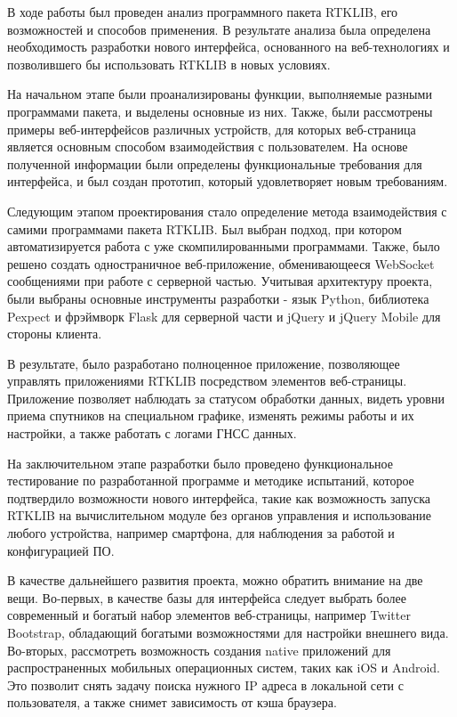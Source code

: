 \conclusion

В ходе работы был проведен анализ программного пакета RTKLIB, его возможностей и способов применения. В результате анализа была определена необходимость разработки нового интерфейса, основанного на веб-технологиях и позволившего бы использовать RTKLIB в новых условиях.

На начальном этапе были проанализированы функции, выполняемые разными программами пакета, и выделены основные из них. Также, были рассмотрены примеры веб-интерфейсов различных устройств, для которых веб-страница является основным способом взаимодействия с пользователем. На основе полученной информации были определены функциональные требования для интерфейса, и был создан прототип, который удовлетворяет новым требованиям.

Следующим этапом проектирования стало определение метода взаимодействия с самими программами пакета RTKLIB. Был выбран подход, при котором автоматизируется работа с уже скомпилированными программами. Также, было решено создать одностраничное веб-приложение, обменивающееся WebSocket сообщениями при работе с серверной частью. Учитывая архитектуру проекта, были выбраны основные инструменты разработки - язык Python, библиотека Pexpect и фрэймворк Flask для серверной части и jQuery и jQuery Mobile для стороны клиента.

В результате, было разработано полноценное приложение, позволяющее управлять приложениями RTKLIB посредством элементов веб-страницы. Приложение позволяет наблюдать за статусом обработки данных, видеть уровни приема спутников на специальном графике, изменять режимы работы и их настройки, а также работать с логами ГНСС данных.

На заключительном этапе разработки было проведено функциональное тестирование по разработанной программе и методике испытаний, которое подтвердило возможности нового интерфейса, такие как возможность запуска RTKLIB на вычислительном модуле без органов управления и использование любого устройства, например смартфона, для наблюдения за работой и конфигурацией ПО.

В качестве дальнейшего развития проекта, можно обратить внимание на две вещи. Во-первых, в качестве базы для интерфейса следует выбрать более современный и богатый набор элементов веб-страницы, например Twitter Bootstrap, обладающий богатыми возможностями для настройки внешнего вида. Во-вторых, рассмотреть возможность создания native приложений для распространенных мобильных операционных систем, таких как iOS и Android. Это позволит снять задачу поиска нужного IP адреса в локальной сети с пользователя, а также снимет зависимость от кэша браузера.